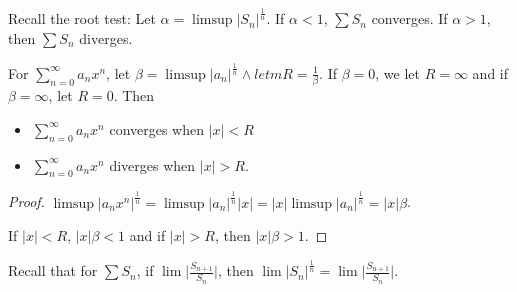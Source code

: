 \documentclass{report}
\begin{document}
Recall the root test: Let $\alpha = \limsup \lvert S_{n} \rvert^{\frac{1}{n}}$. If $\alpha <1$, $\sum S_{n}$ converges. If $\alpha >1$, then $\sum S_{n}$ diverges. 

\begin{theorem}{23.1}
    For $\sum_{n = 0}^{\infty} a_{n}x^{n}$, let $\beta = \limsup \lvert a_{n} \rvert^{\frac{1}{n}} \land let mR = \frac{1}{\beta}$. If $\beta = 0$, we let $R = \infty$ and if $\beta = \infty$, let $R = 0$. Then 
        \begin{itemize}
            \item $\sum_{n = 0}^{ \infty} a_{n}x^{n}$ converges when $\lvert x \rvert < R$

            \item $\sum_{n = 0}^{\infty} a_{n}x^{n}$ diverges when $ \lvert x \rvert> R$.
        \end{itemize}
\end{theorem}

\begin{proof}
    $\limsup \lvert a_{n}x^{n} \rvert^{\frac{1}{n}} = \limsup \lvert a_{n} \rvert^{\frac{1}{n}}\lvert x \rvert = \lvert x \rvert \limsup \lvert a_{n} \rvert^{\frac{1}{n}} = \lvert x \rvert\beta$.

    If $\lvert x \rvert < R$, $\lvert x \rvert \beta <1$ and if $\lvert x \rvert > R$, then $\lvert x \rvert\beta>1$.
\end{proof}

Recall that for $\sum S_{n}$, if $\lim \lvert \frac{S_{n + 1}}{S_{n}} \rvert$, then $ \lim \lvert S_{n} \rvert^{\frac{1}{n}} = \lim \lvert \frac{S_{n + 1}}{S_{n}} \rvert$.
\end{document}
